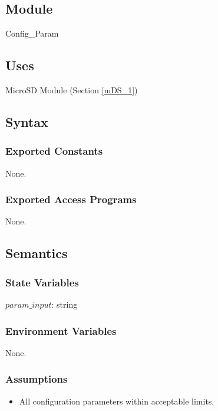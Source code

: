 \documentclass[12pt, titlepage]{article}
\begin{document}
\subsection{Module}

Config\_Param

\subsection{Uses}

MicroSD Module (Section \ref{mDS_1})

\subsection{Syntax}

\subsubsection{Exported Constants}

None.

\subsubsection{Exported Access Programs}

None.

\subsection{Semantics}

\subsubsection{State Variables}

$param\_input$: string

\subsubsection{Environment Variables}

None.

\subsubsection{Assumptions}

\begin{itemize}
\item All configuration parameters within acceptable limits.
\end{itemize}
\end{document}

